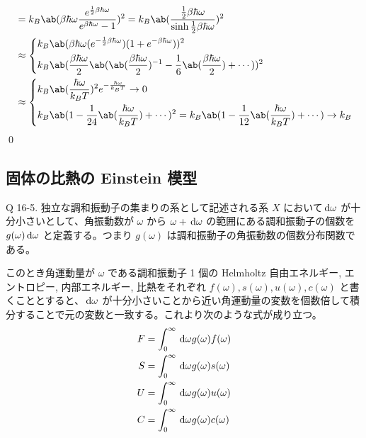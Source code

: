 \documentclass[uplatex,diffipdfmx,a4paper,11pt]{jlreq}
\makeatletter
\theoremstyle{definition}
\renewenvironment{proof}[1][\proofname]{\par
  \normalfont
  \topsep6\p@\@plus6\p@ \trivlist
  \item[\hskip\labelsep{\bfseries #1}\@addpunct{\bfseries}]\ignorespaces\quad\par
}{%
  \qed\endtrivlist\@endpefalse
}
\renewcommand\proofname{証明}
\makeatother
\begin{document}
\begin{proof}
\begin{align}
      & = k_B\ab(\beta\hbar\omega\frac{e^{\frac{1}{2}\beta\hbar\omega}}{e^{\beta\hbar\omega} - 1})^2 = k_B\ab(\frac{\frac{1}{2}\beta\hbar\omega}{\sinh\frac{1}{2}\beta\hbar\omega})^2 \\
      & \approx \begin{dcases}
                  k_B\ab(\beta\hbar\omega(e^{-\frac{1}{2}\beta\hbar\omega})(1 + e^{-\beta\hbar\omega}))^2                                             \\
                  k_B\ab(\frac{\beta\hbar\omega}{2}\ab(\ab(\frac{\beta\hbar\omega}{2})^{-1} - \frac{1}{6}\ab(\frac{\beta\hbar\omega}{2}) + \cdots))^2 \\
                \end{dcases}                                                                               \\
      & \approx \begin{dcases}
                  k_B\ab(\frac{\hbar\omega}{k_BT})^2e^{-\frac{\hbar\omega}{k_BT}} \to 0 \\
                  k_B\ab(1 - \frac{1}{24}\ab(\frac{\hbar\omega}{k_BT}) + \cdots)^2 = k_B\ab(1 - \frac{1}{12}\ab(\frac{\hbar\omega}{k_BT}) + \cdots) \to k_B
                \end{dcases}
  \end{align}
\end{proof}


\subsection{固体の比熱の Einstein 模型}
\begin{itembox}[l]{Q 16-5.}
  独立な調和振動子の集まりの系として記述される系 $X$ において$\dl{\omega}$ が十分小さいとして、角振動数が $\omega$ から $\omega + \dl{\omega}$ の範囲にある調和振動子の個数を $g(\omega)\dl{\omega}$ と定義する。つまり $g(\omega)$ は調和振動子の角振動数の個数分布関数である。
\end{itembox}
このとき角運動量が $\omega$ である調和振動子 1 個の Helmholtz 自由エネルギー, エントロピー, 内部エネルギー, 比熱をそれぞれ $f(\omega), s(\omega), u(\omega), c(\omega)$ と書くこととすると、$\dl{\omega}$ が十分小さいことから近い角運動量の変数を個数倍して積分することで元の変数と一致する。これより次のような式が成り立つ。
\begin{align}
  F & = \int_0^\infty\dl{\omega}g(\omega)f(\omega) \\
  S & = \int_0^\infty\dl{\omega}g(\omega)s(\omega) \\
  U & = \int_0^\infty\dl{\omega}g(\omega)u(\omega) \\
  C & = \int_0^\infty\dl{\omega}g(\omega)c(\omega)
\end{align}
\end{document}
